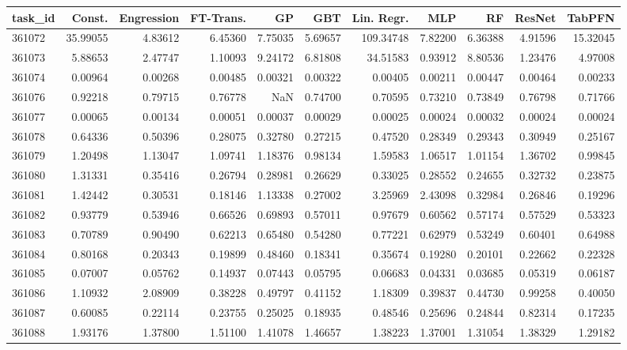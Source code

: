 \begin{tabular}{lrrrrrrrrrr}
\toprule
task\_id & Const. & Engression & FT-Trans. & GP & GBT & Lin. Regr. & MLP & RF & ResNet & TabPFN \\
\midrule
361072 & 35.99055 & 4.83612 & 6.45360 & 7.75035 & 5.69657 & 109.34748 & 7.82200 & 6.36388 & 4.91596 & 15.32045 \\
361073 & 5.88653 & 2.47747 & 1.10093 & 9.24172 & 6.81808 & 34.51583 & 0.93912 & 8.80536 & 1.23476 & 4.97008 \\
361074 & 0.00964 & 0.00268 & 0.00485 & 0.00321 & 0.00322 & 0.00405 & 0.00211 & 0.00447 & 0.00464 & 0.00233 \\
361076 & 0.92218 & 0.79715 & 0.76778 & NaN & 0.74700 & 0.70595 & 0.73210 & 0.73849 & 0.76798 & 0.71766 \\
361077 & 0.00065 & 0.00134 & 0.00051 & 0.00037 & 0.00029 & 0.00025 & 0.00024 & 0.00032 & 0.00024 & 0.00024 \\
361078 & 0.64336 & 0.50396 & 0.28075 & 0.32780 & 0.27215 & 0.47520 & 0.28349 & 0.29343 & 0.30949 & 0.25167 \\
361079 & 1.20498 & 1.13047 & 1.09741 & 1.18376 & 0.98134 & 1.59583 & 1.06517 & 1.01154 & 1.36702 & 0.99845 \\
361080 & 1.31331 & 0.35416 & 0.26794 & 0.28981 & 0.26629 & 0.33025 & 0.28552 & 0.24655 & 0.32732 & 0.23875 \\
361081 & 1.42442 & 0.30531 & 0.18146 & 1.13338 & 0.27002 & 3.25969 & 2.43098 & 0.32984 & 0.26846 & 0.19296 \\
361082 & 0.93779 & 0.53946 & 0.66526 & 0.69893 & 0.57011 & 0.97679 & 0.60562 & 0.57174 & 0.57529 & 0.53323 \\
361083 & 0.70789 & 0.90490 & 0.62213 & 0.65480 & 0.54280 & 0.77221 & 0.62979 & 0.53249 & 0.60401 & 0.64988 \\
361084 & 0.80168 & 0.20343 & 0.19899 & 0.48460 & 0.18341 & 0.35674 & 0.19280 & 0.20101 & 0.22662 & 0.22328 \\
361085 & 0.07007 & 0.05762 & 0.14937 & 0.07443 & 0.05795 & 0.06683 & 0.04331 & 0.03685 & 0.05319 & 0.06187 \\
361086 & 1.10932 & 2.08909 & 0.38228 & 0.49797 & 0.41152 & 1.18309 & 0.39837 & 0.44730 & 0.99258 & 0.40050 \\
361087 & 0.60085 & 0.22114 & 0.23755 & 0.25025 & 0.18935 & 0.48546 & 0.25696 & 0.24844 & 0.82314 & 0.17235 \\
361088 & 1.93176 & 1.37800 & 1.51100 & 1.41078 & 1.46657 & 1.38223 & 1.37001 & 1.31054 & 1.38329 & 1.29182 \\

\end{tabular}
